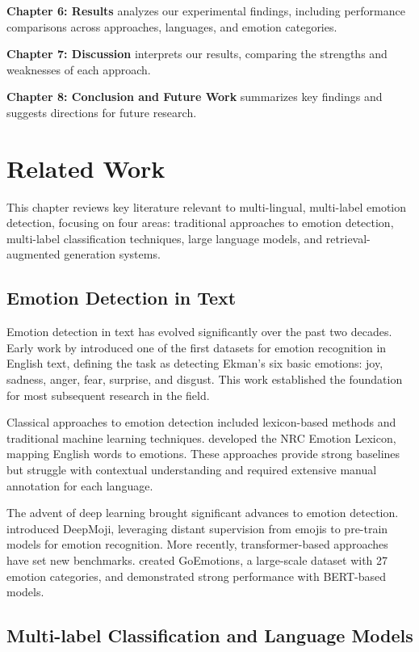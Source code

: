 \documentclass[a4paper,12pt]{extarticle}
\begin{document}
\textbf{Chapter 6: Results} analyzes our experimental findings, including performance comparisons across approaches, languages, and emotion categories.

\textbf{Chapter 7: Discussion} interprets our results, comparing the strengths and weaknesses of each approach.

\textbf{Chapter 8: Conclusion and Future Work} summarizes key findings and suggests directions for future research.

\section{Related Work}

This chapter reviews key literature relevant to multi-lingual, multi-label emotion detection, focusing on four areas: traditional approaches to emotion detection, multi-label classification techniques, large language models, and retrieval-augmented generation systems.

\subsection{Emotion Detection in Text}

Emotion detection in text has evolved significantly over the past two decades. Early work by \cite{strapparava2007semeval} introduced one of the first datasets for emotion recognition in English text, defining the task as detecting Ekman's six basic emotions: joy, sadness, anger, fear, surprise, and disgust. This work established the foundation for most subsequent research in the field.

Classical approaches to emotion detection included lexicon-based methods and traditional machine learning techniques. \cite{mohammad2013crowdsourcing} developed the NRC Emotion Lexicon, mapping English words to emotions. These approaches provide strong baselines but struggle with contextual understanding and required extensive manual annotation for each language.

The advent of deep learning brought significant advances to emotion detection. \cite{felbo2017using} introduced DeepMoji, leveraging distant supervision from emojis to pre-train models for emotion recognition. More recently, transformer-based approaches have set new benchmarks. \cite{demszky2020goemotions} created GoEmotions, a large-scale dataset with 27 emotion categories, and demonstrated strong performance with BERT-based models.

\subsection{Multi-label Classification and Language Models}
\end{document}
